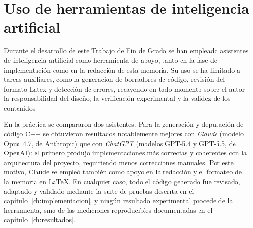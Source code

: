 \section{Uso de herramientas de inteligencia artificial}
Durante el desarrollo de este Trabajo de Fin de Grado se han empleado asistentes de inteligencia artificial como herramienta de apoyo, tanto en la fase de implementación como en la redacción de esta memoria. Su uso se ha limitado a tareas auxiliares, como la generación de borradores de código, revisión del formato Latex y detección de errores, recayendo en todo momento sobre el autor la responsabilidad del diseño, la verificación experimental y la validez de los contenidos.

En la práctica se compararon dos asistentes. Para la generación y depuración de código C++ se obtuvieron resultados notablemente mejores con \emph{Claude} (modelo Opus~4.7, de Anthropic) que con \emph{ChatGPT} (modelos GPT-5.4 y GPT-5.5, de OpenAI): el primero produjo implementaciones más correctas y coherentes con la arquitectura del proyecto, requiriendo menos correcciones manuales. Por este motivo, Claude se empleó también como apoyo en la redacción y el formateo de la memoria en \LaTeX. En cualquier caso, todo el código generado fue revisado, adaptado y validado mediante la suite de pruebas descrita en el capítulo~\ref{ch:implementacion}, 
y ningún resultado experimental procede de la herramienta, sino de las mediciones reproducibles documentadas en el capítulo~\ref{ch:resultados}.